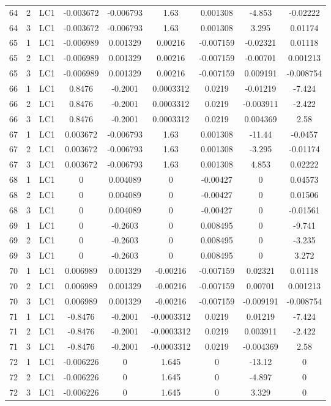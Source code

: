 \documentclass{article}%
\begin{document}
\begin{longtable}{| c c c | c c c c c c |}
64&2&LC1&{-}0.003672&{-}0.006793&1.63&0.001308&{-}4.853&{-}0.02222\\%
64&3&LC1&{-}0.003672&{-}0.006793&1.63&0.001308&3.295&0.01174\\%
65&1&LC1&{-}0.006989&0.001329&0.00216&{-}0.007159&{-}0.02321&0.01118\\%
65&2&LC1&{-}0.006989&0.001329&0.00216&{-}0.007159&{-}0.00701&0.001213\\%
65&3&LC1&{-}0.006989&0.001329&0.00216&{-}0.007159&0.009191&{-}0.008754\\%
66&1&LC1&0.8476&{-}0.2001&0.0003312&0.0219&{-}0.01219&{-}7.424\\%
66&2&LC1&0.8476&{-}0.2001&0.0003312&0.0219&{-}0.003911&{-}2.422\\%
66&3&LC1&0.8476&{-}0.2001&0.0003312&0.0219&0.004369&2.58\\%
67&1&LC1&0.003672&{-}0.006793&1.63&0.001308&{-}11.44&{-}0.0457\\%
67&2&LC1&0.003672&{-}0.006793&1.63&0.001308&{-}3.295&{-}0.01174\\%
67&3&LC1&0.003672&{-}0.006793&1.63&0.001308&4.853&0.02222\\%
68&1&LC1&0&0.004089&0&{-}0.00427&0&0.04573\\%
68&2&LC1&0&0.004089&0&{-}0.00427&0&0.01506\\%
68&3&LC1&0&0.004089&0&{-}0.00427&0&{-}0.01561\\%
69&1&LC1&0&{-}0.2603&0&0.008495&0&{-}9.741\\%
69&2&LC1&0&{-}0.2603&0&0.008495&0&{-}3.235\\%
69&3&LC1&0&{-}0.2603&0&0.008495&0&3.272\\%
70&1&LC1&0.006989&0.001329&{-}0.00216&{-}0.007159&0.02321&0.01118\\%
70&2&LC1&0.006989&0.001329&{-}0.00216&{-}0.007159&0.00701&0.001213\\%
70&3&LC1&0.006989&0.001329&{-}0.00216&{-}0.007159&{-}0.009191&{-}0.008754\\%
71&1&LC1&{-}0.8476&{-}0.2001&{-}0.0003312&0.0219&0.01219&{-}7.424\\%
71&2&LC1&{-}0.8476&{-}0.2001&{-}0.0003312&0.0219&0.003911&{-}2.422\\%
71&3&LC1&{-}0.8476&{-}0.2001&{-}0.0003312&0.0219&{-}0.004369&2.58\\%
72&1&LC1&{-}0.006226&0&1.645&0&{-}13.12&0\\%
72&2&LC1&{-}0.006226&0&1.645&0&{-}4.897&0\\%
72&3&LC1&{-}0.006226&0&1.645&0&3.329&0\\%

\end{longtable}
\end{document}

